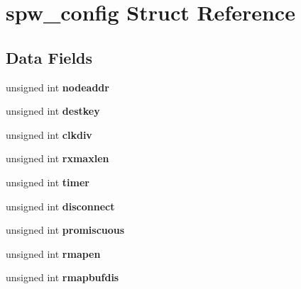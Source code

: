 \hypertarget{structspw__config}{}\section{spw\+\_\+config Struct Reference}
\label{structspw__config}
\subsection*{Data Fields}
\begin{DoxyCompactItemize}
\item 
\mbox{\label{structspw__config_a753c770c2eafe5822d654ca8119f0759}} 
unsigned int {\bfseries nodeaddr}
\item 
\mbox{\label{structspw__config_aaceaa9632948b378b9e6da4795f929f6}} 
unsigned int {\bfseries destkey}
\item 
\mbox{\label{structspw__config_a6ca4d6bd7730e4118621f9bfe9adf9e4}} 
unsigned int {\bfseries clkdiv}
\item 
\mbox{\label{structspw__config_ab2a7bb8a25ce7bf917b952e7dab79598}} 
unsigned int {\bfseries rxmaxlen}
\item 
\mbox{\label{structspw__config_a65d4e8974341494b18d6a126562cdb06}} 
unsigned int {\bfseries timer}
\item 
\mbox{\label{structspw__config_afc07fbb4c56151332d2fa02ff386a128}} 
unsigned int {\bfseries disconnect}
\item 
\mbox{\label{structspw__config_a1f82b58001eac802f37cc6e6cf72bf31}} 
unsigned int {\bfseries promiscuous}
\item 
\mbox{\label{structspw__config_a608dd3b58b0064eabcea0e764c518b24}} 
unsigned int {\bfseries rmapen}
\item 
\mbox{\label{structspw__config_a63557088dd0c7ddbc8fe066c31ebef7e}} 
unsigned int {\bfseries rmapbufdis}
\item 
\mbox{\label{structspw__config_a2031b8605ec19e07edb980bdd6c472f1}} 

\end{DoxyCompactItemize}
